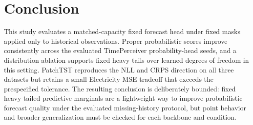 \section{Conclusion}
\label{sec:conclusion}

This study evaluates a matched-capacity fixed \StudentT{} forecast head under fixed masks applied only to historical observations. Proper probabilistic scores improve consistently across the evaluated TimePerceiver probability-head seeds, and a distribution ablation supports fixed heavy tails over learned degrees of freedom in this setting. PatchTST reproduces the NLL and CRPS direction on all three datasets but retains a small Electricity MSE tradeoff that exceeds the prespecified tolerance. The resulting conclusion is deliberately bounded: fixed heavy-tailed predictive marginals are a lightweight way to improve probabilistic forecast quality under the evaluated missing-history protocol, but point behavior and broader generalization must be checked for each backbone and condition.
